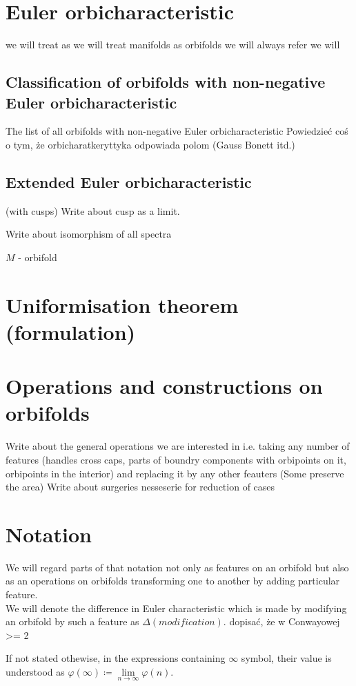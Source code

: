\section{Euler orbicharacteristic}\label{E_orb}
\label{\Eoc_as_a_sum}
we will treat 
as we will treat manifolds as orbifolds we will always refer 
we will 
\subsection{Classification of orbifolds with non-negative Euler orbicharacteristic}
The list of all orbifolds with non-negative Euler orbicharacteristic
Powiedzieć coś o tym, że orbicharatkeryttyka odpowiada polom (Gauss Bonett itd.)
\subsection{Extended Euler orbicharacteristic}\label{extended_Euler_orbicharacteristic} (with cusps)
Write about cusp as a limit.

Write about isomorphism of all spectra

$M$ - orbifold

\section{Uniformisation theorem (formulation)}
\section{Operations and constructions on orbifolds}\label{Operations}
Write about the general operations we are interested in i.e. taking any number of features (handles 
cross caps, parts of boundry components with orbipoints on it, orbipoints in the interior) and
replacing it by any other feauters
(Some preserve the area)
Write about surgeries nesseserie for reduction of cases
\section{Notation}
We will regard parts of that notation not only as features on an orbifold but also as an operations 
on orbifolds transforming one to another by adding particular feature. \\
We will denote the difference in Euler characteristic which is made by modifying 
an orbifold by such a feature as $\Delta(modification)$.
dopisać, że w Conwayowej >= 2

If not stated othewise, in the expressions containing $\infty$ symbol, their value is understood 
as $\varphi(\infty) \coloneqq \lim\limits_{n\to \infty}\varphi(n)$.


